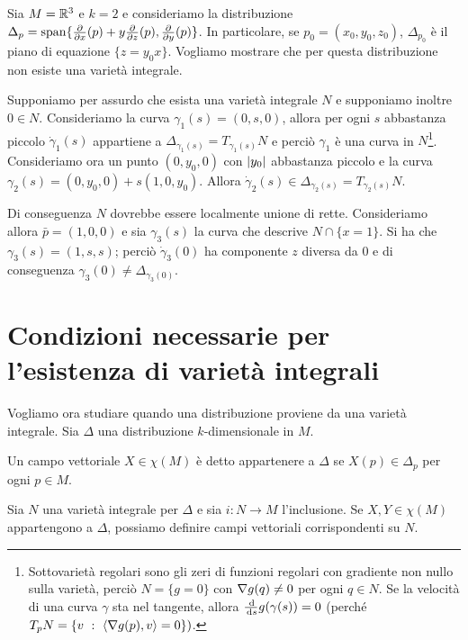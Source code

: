 \begin{example} %
	Sia $M=\mathbb R^3$ e $k=2$ e consideriamo la distribuzione $\Delta_p=\mathrm{span}\{\frac{\partial }{\partial x}(p)+y\frac{\partial }{\partial z}(p),\frac{\partial }{\partial y}(p)\}$.
	In particolare, se $p_0=(x_0,y_0,z_0)$, $\Delta_{p_0}$ è il piano di equazione $\{z=y_0x\}$.
	Vogliamo mostrare che per questa distribuzione non esiste una varietà integrale.
	
	Supponiamo per assurdo che esista una varietà integrale $N$ e supponiamo inoltre $0\in N$.
	Consideriamo la curva $\gamma_1(s)=(0,s,0)$, allora per ogni $s$ abbastanza piccolo $\dot\gamma_1(s)$ appartiene a $\Delta_{\gamma_1(s)}=T_{\gamma_1(s)}N$ e perciò $\gamma_1$ è una curva in $N$\footnote{Sottovarietà regolari sono gli zeri di funzioni regolari con gradiente non nullo sulla varietà, perciò $N=\{g=0\}$ con $\nabla g(q)\ne 0$ per ogni $q\in N$.
	Se la velocità di una curva $\gamma$ sta nel tangente, allora $\frac{\,\mathrm d}{\,\mathrm d s}g(\gamma(s))=0$ (perché $T_pN=\{v\ : \ \langle \nabla g(p) , v \rangle =0\})$.}.
	Consideriamo ora un punto $(0,y_0,0)$ con $\lvert y_0\rvert$ abbastanza piccolo e la curva $\gamma_2(s)=(0,y_0,0)+s(1,0,y_0)$. Allora $\dot\gamma_2(s)\in\Delta_{\gamma_2(s)}=T_{\gamma_2(s)}N$.
	
	Di conseguenza $N$ dovrebbe essere localmente unione di rette. Consideriamo allora $\bar p=(1,0,0)$ e sia $\gamma_3(s)$ la curva che descrive $N\cap\{x=1\}$.
	Si ha che $\gamma_3(s)=(1,s,s)$; perciò $\dot\gamma_3(0)$ ha componente $z$ diversa da 0 e di conseguenza $\gamma_3(0)\ne \Delta_{\gamma_3(0)}$. %
\end{example}

\section{Condizioni necessarie per l'esistenza di varietà integrali} %

Vogliamo ora studiare quando una distribuzione proviene da una varietà integrale.
Sia $\Delta$ una distribuzione $k$-dimensionale in $M$.

\begin{definition}
	Un campo vettoriale $X\in\chi(M)$ è detto appartenere a $\Delta$ se $X(p)\in\Delta_p$ per ogni $p\in M$.
\end{definition}

Sia $N$ una varietà integrale per $\Delta$ e sia $i:N \to M$ l'inclusione.
Se $X,Y\in\chi(M)$ appartengono a $\Delta$, possiamo definire campi vettoriali corrispondenti su $N$.

